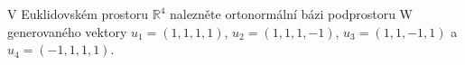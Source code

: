 V Euklidovském prostoru $\mathbb{R}^{4}$ nalezněte ortonormální bázi podprostoru
W generovaného vektory $u_{1}=\left ( 1,1,1,1 \right )$, $u_{2}=\left ( 1,1,1,-1
\right )$, $u_{3}=\left ( 1,1,-1,1 \right )$ a $u_{4}=\left ( -1,1,1,1 \right )$.
